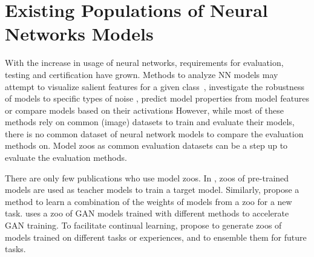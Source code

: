 \section{Existing Populations of Neural Networks Models}
\vspace{-1pt}
With the increase in usage of neural networks, requirements for evaluation, testing and certification have grown. 
Methods to analyze NN models may attempt to visualize salient features for a given class~\citep{zeilerVisualizingUnderstandingConvolutional2014,karpathyVisualizingUnderstandingRecurrent2015,yosinskiUnderstandingNeuralNetworks2015}, investigate the robustness of models to specific types of noise \citep{zintgrafVisualizingDeepNeural2017,dabkowskiRealTimeImage2017}, predict model properties from model features \citep{yakTaskArchitectureIndependentGeneralization2019, jiangPredictingGeneralizationGap2019,corneanuComputingTestingError2020} or compare models based on their activations \citep{raghuSVCCASingularVector2017,morcosInsightsRepresentationalSimilarity2018,nguyenWideDeepNetworks2020}
%
However, while most of these methods rely on common (image) datasets to train and evaluate their models, there is no common dataset of neural network models to compare the evaluation methods on.
Model zoos as common evaluation datasets can be a step up to evaluate the evaluation methods.
%

There are only few publications who use model zoos.
In \citep{liuKnowledgeFlowImprove2019}, zoos of pre-trained models are used as teacher models to train a target model. 
Similarly, \citep{shuZooTuningAdaptiveTransfer2021} propose a method to learn a combination of the weights of models from a zoo for a new task. 
\citep{zhouJittorGANFasttrainingGenerative2021} uses a zoo of GAN models trained with different methods to accelerate GAN training.
To facilitate continual learning, \citep{rameshModelZooGrowing2022} propose to generate zoos of models trained on different tasks or experiences, and to ensemble them for future tasks.

